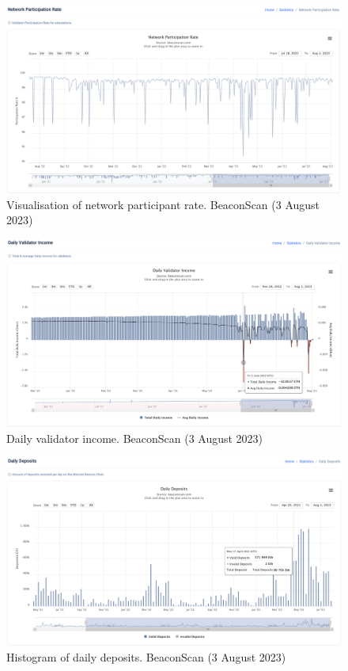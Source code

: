 \documentclass[UTF8]{article}
\begin{document}
\begin{figure}[htbp]
\begin{center}
\includegraphics[width=\linewidth]{images/beaconscan11}
\caption{Visualisation of network participant rate. BeaconScan (3 August 2023)}
\label{fig:beaconscan11}
\end{center}
\end{figure}

\begin{figure}[htbp]
\begin{center}
\includegraphics[width=\linewidth]{images/beaconscan12}
\caption{Daily validator income. BeaconScan (3 August 2023)}
\label{fig:beaconscan12}
\end{center}
\end{figure}

\begin{figure}[htbp]
\begin{center}
\includegraphics[width=\linewidth]{images/beaconscan13}
\caption{Histogram of daily deposits. BeaconScan (3 August 2023)}
\label{fig:beaconscan13}
\end{center}
\end{figure}
\end{document}

